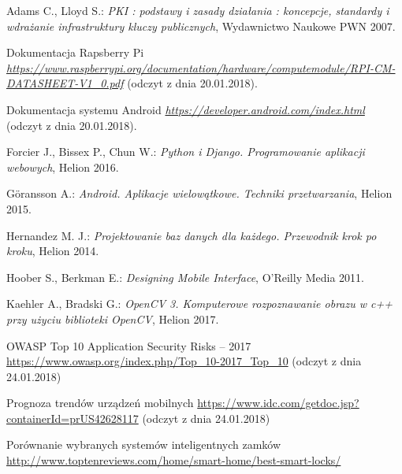 \newpage
   \begin{thebibliography}{99}
    	Adams C., Lloyd S.: 
    	\textit{PKI : podstawy i zasady działania : koncepcje, standardy i wdrażanie infrastruktury kluczy publicznych}, Wydawnictwo Naukowe PWN 2007.
    	
    	Dokumentacja Rapsberry Pi \\
    	\textit{ \href {https://www.raspberrypi.org/documentation/hardware/computemodule/RPI-CM-DATASHEET-V1_0.pdf} {https://www.raspberrypi.org/documentation/hardware/computemodule/RPI-CM-DATASHEET-V1\_0.pdf} }(odczyt z dnia 20.01.2018).
    	 
    	Dokumentacja systemu Android
    	\textit{ \href {https://developer.android.com/index.html} {https://developer.android.com/index.html} }(odczyt z dnia 20.01.2018).
    	 
    	Forcier J., Bissex P., Chun W.:
    	\textit{Python i Django. Programowanie aplikacji webowych}, 
    	Helion 2016.
    	
    	Göransson A.: 
    	\textit{Android. Aplikacje wielowątkowe. Techniki przetwarzania}, 
    	Helion 2015. 
    	
    	Hernandez M. J.: 
    	\textit{Projektowanie baz danych dla każdego. Przewodnik krok po kroku}, 
    	Helion 2014.
    	
    	Hoober S., Berkman E.: 
    	\textit{Designing Mobile Interface}, 
    	 O'Reilly Media 2011.
    	 
    	 Kaehler A., Bradski G.: 
    	 \textit{OpenCV 3. Komputerowe rozpoznawanie obrazu w c++ przy użyciu biblioteki OpenCV}, Helion 2017.
    	 
    	 OWASP Top 10 Application Security Risks -- 2017\\
    	 \href{https://www.owasp.org/index.php/Top_10-2017_Top_10}{https://www.owasp.org/index.php/Top\_10-2017\_Top\_10} (odczyt z dnia 24.01.2018)
    	 
    	 Prognoza trendów urządzeń mobilnych
    	 \href{https://www.idc.com/getdoc.jsp?containerId=prUS42628117}{https://www.idc.com/getdoc.jsp?containerId=prUS42628117} (odczyt z dnia 24.01.2018)
		
		Porównanie wybranych systemów inteligentnych zamków \href{http://www.toptenreviews.com/home/smart-home/best-smart-locks/}{http://www.toptenreviews.com/home/smart-home/best-smart-locks/}
		

\end{thebibliography}
